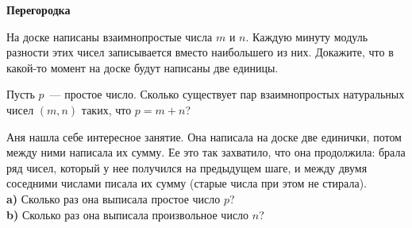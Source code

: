 \begin{center}
\textbf{Перегородка}
\end{center}

\begin{problems}
\item На доске написаны взаимнопростые числа $m$ и $n$. Каждую минуту модуль разности этих чисел записывается вместо наибольшего из них. Докажите, что в какой-то момент на доске будут написаны две единицы. 
\item Пусть $p$~--- простое число. Сколько существует пар взаимнопростых натуральных чисел $(m,n)$ таких, что $p=m+n$? 
\item Аня нашла себе интересное занятие. Она написала на доске две единички, потом между ними написала их сумму. Ее это так захватило, что она продолжила: брала ряд чисел, который у нее получился на предыдущем шаге, и между двумя соседними числами писала их сумму (старые числа при этом не стирала).\\ \textbf{a)} Сколько раз она выписала простое число $p$?\\  \textbf{b)} Сколько раз она выписала произвольное число $n$? 

\end{problems}
